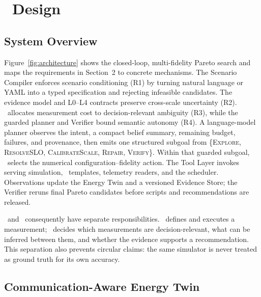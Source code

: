 \section{\system{}\ Design}

\subsection{System Overview}

Figure~\ref{fig:architecture} shows the closed-loop, multi-fidelity Pareto
search and maps the requirements in Section~2 to concrete mechanisms.  The
Scenario Compiler enforces scenario conditioning (R1) by turning natural
language or YAML into a typed specification and rejecting infeasible
candidates.  The evidence model and L0--L4 contracts preserve cross-scale
uncertainty (R2).  \ipig{}\ allocates measurement cost to decision-relevant
ambiguity (R3), while the guarded planner and Verifier bound semantic autonomy
(R4).  A language-model planner
observes the intent, a compact belief summary, remaining budget, failures, and
provenance, then emits one structured subgoal from \{\textsc{Explore},
\textsc{ResolveSLO}, \textsc{CalibrateScale}, \textsc{Repair},
\textsc{Verify}\}.  Within that guarded subgoal, \ipig{}\ selects the numerical
configuration--fidelity action.  The Tool Layer invokes serving simulation,
\bench{}\ templates, telemetry readers, and the scheduler.  Observations update
the Energy Twin and a versioned Evidence Store; the Verifier reruns final
Pareto candidates before scripts and recommendations are released.



\bench{}\ and \system{}\ consequently have separate responsibilities.  \bench{}\
defines and executes a measurement; \system{}\ decides which measurements are
decision-relevant, what can be inferred between them, and whether the evidence
supports a recommendation.  This separation also prevents circular claims:
the same simulator is never treated as ground truth for its own accuracy.

\subsection{Communication-Aware Energy Twin}

